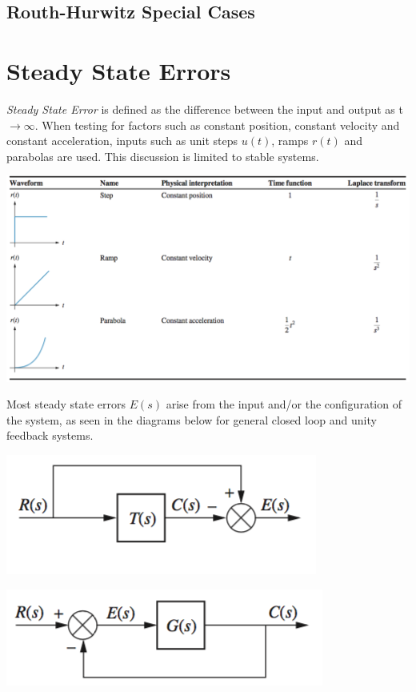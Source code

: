 \documentclass[11pt]{article}
\begin{document}
    \subsection{Routh-Hurwitz Special Cases}
    
    \pagebreak


    \section{Steady State Errors}

    \textit{Steady State Error} is defined as the difference between the input and output as t $\rightarrow \infty$. When testing for factors such as constant position, constant velocity and constant acceleration, inputs such as unit steps $u(t)$, ramps $r(t)$ and parabolas are used. This discussion is limited to stable systems.\\
   
    \begin{center}
        \includegraphics[width=300 px]{img/inputs} \\
    \end{center}

    Most steady state errors $E(s)$ arise from the input and/or the configuration of the system, as seen in the diagrams below for general closed loop and unity feedback systems.

    \begin{center}
        \includegraphics[width=300 px]{img/closedlooperror} \\
    \end{center}

    \begin{center}
        \includegraphics[width=300 px]{img/unityfeedback} \\
    \end{center}
    
\end{document}
